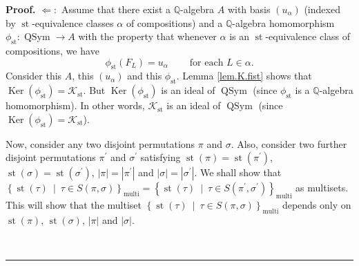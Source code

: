 \documentclass[numbers=enddot,12pt,final,onecolumn,notitlepage]{scrartcl}%
\theoremstyle{definition}
\newenvironment{proof}[1][Proof]{\noindent\textbf{#1.} }{\ \rule{0.5em}{0.5em}}
\newenvironment{verlong}{}{}
\begin{document}
\begin{verlong}
\begin{proof}
$\Longleftarrow:$ Assume that there exist a $\mathbb{Q}$-algebra $A$ with
basis $\left(  u_{\alpha}\right)  $ (indexed by $\operatorname*{st}%
$-equivalence classes $\alpha$ of compositions) and a $\mathbb{Q}$-algebra
homomorphism $\phi_{\operatorname*{st}}:\operatorname*{QSym}\rightarrow A$
with the property that whenever $\alpha$ is an $\operatorname*{st}%
$-equivalence class of compositions, we have%
\[
\phi_{\operatorname*{st}}\left(  F_{L}\right)  =u_{\alpha}%
\ \ \ \ \ \ \ \ \ \ \text{for each }L\in\alpha.
\]
Consider this $A$, this $\left(  u_{\alpha}\right)  $ and this $\phi
_{\operatorname*{st}}$. Lemma \ref{lem.K.fist} shows that $\operatorname*{Ker}%
\left(  \phi_{\operatorname*{st}}\right)  =\mathcal{K}_{\operatorname*{st}}$.
But $\operatorname*{Ker}\left(  \phi_{\operatorname*{st}}\right)  $ is an
ideal of $\operatorname*{QSym}$ (since $\phi_{\operatorname*{st}}$ is a
$\mathbb{Q}$-algebra homomorphism). In other words, $\mathcal{K}%
_{\operatorname*{st}}$ is an ideal of $\operatorname*{QSym}$ (since
$\operatorname*{Ker}\left(  \phi_{\operatorname*{st}}\right)  =\mathcal{K}%
_{\operatorname*{st}}$).

Now, consider any two disjoint permutations $\pi$ and $\sigma$. Also, consider
two further disjoint permutations $\pi^{\prime}$ and $\sigma^{\prime}$
satisfying $\operatorname*{st}\left(  \pi\right)  =\operatorname*{st}\left(
\pi^{\prime}\right)  $, $\operatorname*{st}\left(  \sigma\right)
=\operatorname*{st}\left(  \sigma^{\prime}\right)  $, $\left\vert
\pi\right\vert =\left\vert \pi^{\prime}\right\vert $ and $\left\vert
\sigma\right\vert =\left\vert \sigma^{\prime}\right\vert $. We shall show that
$\left\{  \operatorname*{st}\left(  \tau\right)  \ \mid\ \tau\in S\left(
\pi,\sigma\right)  \right\}  _{\operatorname*{multi}} =\left\{
\operatorname*{st}\left(  \tau\right)  \ \mid\ \tau\in S\left(  \pi^{\prime
},\sigma^{\prime}\right)  \right\}  _{\operatorname*{multi}} $ as multisets.
This will show that the multiset \newline$\left\{  \operatorname*{st}\left(
\tau\right)  \ \mid\ \tau\in S\left(  \pi,\sigma\right)  \right\}
_{\operatorname*{multi}} $ depends only on $\operatorname*{st}\left(
\pi\right)  $, $\operatorname*{st}\left(  \sigma\right)  $, $\left\vert
\pi\right\vert $ and $\left\vert \sigma\right\vert $.


\end{proof}
\end{verlong}
\end{document}
